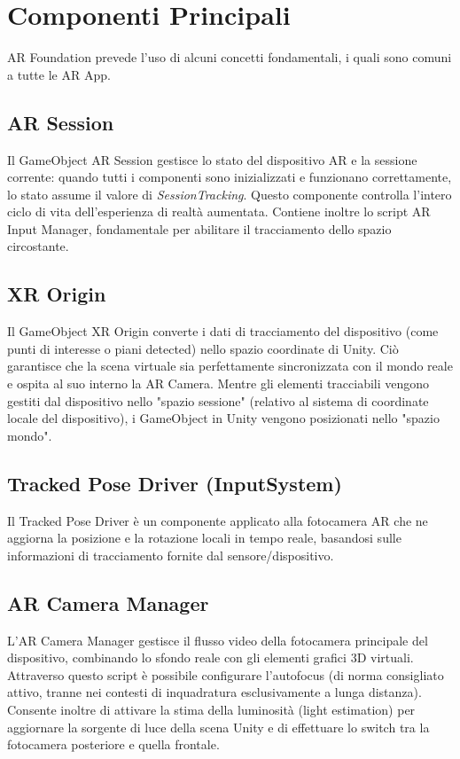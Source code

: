 \section{Componenti Principali}
AR Foundation\cite{AR-Foundation-3} prevede l'uso di alcuni concetti fondamentali, i quali sono comuni a tutte le AR App.

\subsection{AR Session}
Il GameObject AR Session gestisce lo stato del dispositivo AR e la sessione corrente: quando tutti i componenti sono inizializzati e funzionano correttamente, lo stato assume il valore di \textit{SessionTracking}. Questo componente controlla l'intero ciclo di vita dell'esperienza di realtà aumentata.
Contiene inoltre lo script AR Input Manager, fondamentale per abilitare il tracciamento dello spazio circostante.

\subsection{XR Origin}
Il GameObject XR Origin converte i dati di tracciamento del dispositivo (come punti di interesse o piani detected) nello spazio coordinate di Unity. Ciò garantisce che la scena virtuale sia perfettamente sincronizzata con il mondo reale e ospita al suo interno la AR Camera.
Mentre gli elementi tracciabili vengono gestiti dal dispositivo nello "spazio sessione" (relativo al sistema di coordinate locale del dispositivo), i GameObject in Unity vengono posizionati nello "spazio mondo".

\subsection{Tracked Pose Driver (InputSystem)}
Il Tracked Pose Driver è un componente applicato alla fotocamera AR che ne aggiorna la posizione e la rotazione locali in tempo reale, basandosi sulle informazioni di tracciamento fornite dal sensore/dispositivo.

\subsection{AR Camera Manager}
L'AR Camera Manager gestisce il flusso video della fotocamera principale del dispositivo, combinando lo sfondo reale con gli elementi grafici 3D virtuali. Attraverso questo script è possibile configurare l'autofocus (di norma consigliato attivo, tranne nei contesti di inquadratura esclusivamente a lunga distanza).
Consente inoltre di attivare la stima della luminosità (light estimation) per aggiornare la sorgente di luce della scena Unity e di effettuare lo switch tra la fotocamera posteriore e quella frontale.


